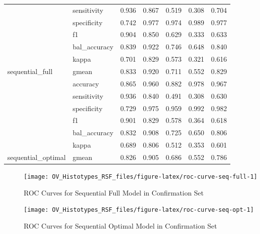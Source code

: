 \documentclass[
]{report}
\begin{document}
\begin{table}
\begin{tabular}[t]{l|l|r|r|r|r|r}
\cline{2-7}
 & sensitivity & 0.936 & 0.867 & 0.519 & 0.308 & 0.704\\
\cline{2-7}
 & specificity & 0.742 & 0.977 & 0.974 & 0.989 & 0.977\\
\cline{2-7}
 & f1 & 0.904 & 0.850 & 0.629 & 0.333 & 0.633\\
\cline{2-7}
 & bal\_accuracy & 0.839 & 0.922 & 0.746 & 0.648 & 0.840\\
\cline{2-7}
 & kappa & 0.701 & 0.829 & 0.573 & 0.321 & 0.616\\
\cline{2-7}
\multirow{-7}{*}{\raggedright\arraybackslash sequential\_full} & gmean & 0.833 & 0.920 & 0.711 & 0.552 & 0.829\\
\cline{1-7}
 & accuracy & 0.865 & 0.960 & 0.882 & 0.978 & 0.967\\
\cline{2-7}
 & sensitivity & 0.936 & 0.840 & 0.491 & 0.308 & 0.630\\
\cline{2-7}
 & specificity & 0.729 & 0.975 & 0.959 & 0.992 & 0.982\\
\cline{2-7}
 & f1 & 0.901 & 0.829 & 0.578 & 0.364 & 0.618\\
\cline{2-7}
 & bal\_accuracy & 0.832 & 0.908 & 0.725 & 0.650 & 0.806\\
\cline{2-7}
 & kappa & 0.689 & 0.806 & 0.512 & 0.353 & 0.601\\
\cline{2-7}
\multirow{-7}{*}{\raggedright\arraybackslash sequential\_optimal} & gmean & 0.826 & 0.905 & 0.686 & 0.552 & 0.786\\
\hline
\end{tabular}
\end{table}

\begin{figure}[H]

{\centering \texttt{[image: OV\_Histotypes\_RSF\_files/figure-latex/roc-curve-seq-full-1]} 

}

\caption{ROC Curves for Sequential Full Model in Confirmation Set}\label{fig:roc-curve-seq-full}
\end{figure}

\begin{figure}[H]

{\centering \texttt{[image: OV\_Histotypes\_RSF\_files/figure-latex/roc-curve-seq-opt-1]} 

}

\caption{ROC Curves for Sequential Optimal Model in Confirmation Set}\label{fig:roc-curve-seq-opt}
\end{figure}
\end{document}
